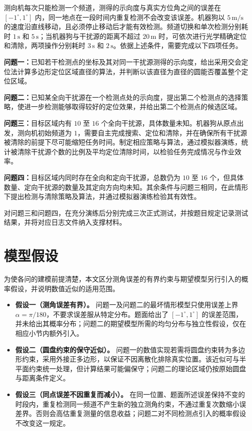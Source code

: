 \documentclass[UTF8,a4paper,zihao=-4,fontset=none]{ctexart}
\begin{document}
测向机每次只能检测一个频道，测得的示向度与真实方位角之间的误差在 \([-1^\circ,1^\circ]\) 内，同一地点在一段时间内重复检测不会改变该误差。机器狗以 \(5\,\mathrm{m/s}\) 的速度沿直线移动，且必须停止移动后才能有效检测。频道切换和单次检测分别耗时 \(1\,\mathrm{s}\) 和 \(5\,\mathrm{s}\)；当机器狗与干扰源的距离不超过 \(20\,\mathrm{m}\) 时，可依次进行光学精确定位和清除，两项操作分别耗时 \(3\,\mathrm{s}\) 和 \(2\,\mathrm{s}\)。依据上述条件，需要完成以下四项任务。

\textbf{问题一：}已知若干检测点的坐标及其对同一干扰源测得的示向度，给出采用交会定位法计算多边形定位区域直径的算法，并判断以该直径为直径的圆能否覆盖整个定位区域。

\textbf{问题二：}已知某全向干扰源在一个检测点处的示向度，提出第二个检测点的选择策略，使进一步检测能够取得较好的定位效果，并给出第二个检测点的候选区域。

\textbf{问题三：}目标区域内有 \(10\) 至 \(16\) 个全向干扰源，具体数量未知。机器狗从原点出发，测向机初始频道为 \(1\)，需要自主完成搜索、定位和清除，并在确保所有干扰源被清除的前提下尽可能缩短任务时间。制定相应策略与算法，通过模拟器演练，统计被清除干扰源个数的比例及平均定位清除时间，以检验任务完成情况与作业效率。

\textbf{问题四：}目标区域内同时存在全向和定向干扰源，总数仍为 \(10\) 至 \(16\) 个，但具体数量、定向干扰源的数量及其定向方向均未知。其余条件与问题三相同，在此情形下提出检测与清除策略及算法，并通过模拟器演练检验其有效性。

对问题三和问题四，在充分演练后分别完成三次正式测试，并按题目规定记录测试结果，并将对应日志文件纳入支撑材料。

\section{模型假设}

为使各问的建模前提清楚，本文区分测角误差的有界约束与期望模型另行引入的概率假设，并说明数值近似的适用范围。

\begin{itemize}[label=\textbullet,leftmargin=2em]
  \item \textbf{假设一（测角误差有界）。} 问题一及问题二的最坏情形模型只使用误差上界 \(\alpha=\pi/180\)，不要求误差服从特定分布。题面给出了 \([-1^\circ,1^\circ]\) 的误差范围，并未给出其概率分布；问题二的期望模型所需的均匀分布与独立性假设，仅在相应小节内额外引入。
  \item \textbf{假设二（圆盘约束的保守近似）。} 问题一的数值实现若需将圆盘约束转为多边形约束，采用外接正多边形，以保证不因离散化排除真实位置。该近似可与半平面约束统一处理，但计算结果可能偏保守；问题二的理论区域仍按原始圆盘与距离条件定义。
  \item \textbf{假设三（同点误差不因重复而减小）。} 在同一位置、题面所述误差保持不变的时段内，重复检测同一频道不产生新的独立测角约束，不通过重复次数缩小误差界。否则会高估重复测量的信息收益；问题二对不同检测点引入的概率假设不改变这一规定。
\end{itemize}
\end{document}
